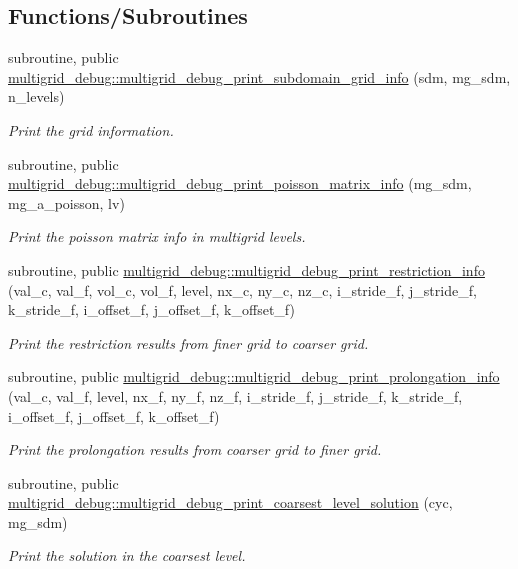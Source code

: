 \subsection*{Functions/\+Subroutines}
\begin{DoxyCompactItemize}
\item 
subroutine, public \hyperlink{namespacemultigrid__debug_aa5dcd15e32c5dc719638263835c5ed43}{multigrid\+\_\+debug\+::multigrid\+\_\+debug\+\_\+print\+\_\+subdomain\+\_\+grid\+\_\+info} (sdm, mg\+\_\+sdm, n\+\_\+levels)
\begin{DoxyCompactList}\small\item\em Print the grid information. \end{DoxyCompactList}\item 
subroutine, public \hyperlink{namespacemultigrid__debug_aae55d6fc6a22d97825619d5bb58a1b88}{multigrid\+\_\+debug\+::multigrid\+\_\+debug\+\_\+print\+\_\+poisson\+\_\+matrix\+\_\+info} (mg\+\_\+sdm, mg\+\_\+a\+\_\+poisson, lv)
\begin{DoxyCompactList}\small\item\em Print the poisson matrix info in multigrid levels. \end{DoxyCompactList}\item 
subroutine, public \hyperlink{namespacemultigrid__debug_a99e36a8239b91fbf3681cd88ab8f06dd}{multigrid\+\_\+debug\+::multigrid\+\_\+debug\+\_\+print\+\_\+restriction\+\_\+info} (val\+\_\+c, val\+\_\+f, vol\+\_\+c, vol\+\_\+f, level, nx\+\_\+c, ny\+\_\+c, nz\+\_\+c, i\+\_\+stride\+\_\+f, j\+\_\+stride\+\_\+f, k\+\_\+stride\+\_\+f, i\+\_\+offset\+\_\+f, j\+\_\+offset\+\_\+f, k\+\_\+offset\+\_\+f)
\begin{DoxyCompactList}\small\item\em Print the restriction results from finer grid to coarser grid. \end{DoxyCompactList}\item 
subroutine, public \hyperlink{namespacemultigrid__debug_a4e9617a0cc65c4169970f289117de416}{multigrid\+\_\+debug\+::multigrid\+\_\+debug\+\_\+print\+\_\+prolongation\+\_\+info} (val\+\_\+c, val\+\_\+f, level, nx\+\_\+f, ny\+\_\+f, nz\+\_\+f, i\+\_\+stride\+\_\+f, j\+\_\+stride\+\_\+f, k\+\_\+stride\+\_\+f, i\+\_\+offset\+\_\+f, j\+\_\+offset\+\_\+f, k\+\_\+offset\+\_\+f)
\begin{DoxyCompactList}\small\item\em Print the prolongation results from coarser grid to finer grid. \end{DoxyCompactList}\item 
subroutine, public \hyperlink{namespacemultigrid__debug_ad5c036138c7fd5e103641a667a88e6cf}{multigrid\+\_\+debug\+::multigrid\+\_\+debug\+\_\+print\+\_\+coarsest\+\_\+level\+\_\+solution} (cyc, mg\+\_\+sdm)
\begin{DoxyCompactList}\small\item\em Print the solution in the coarsest level. \end{DoxyCompactList}\end{DoxyCompactItemize}


